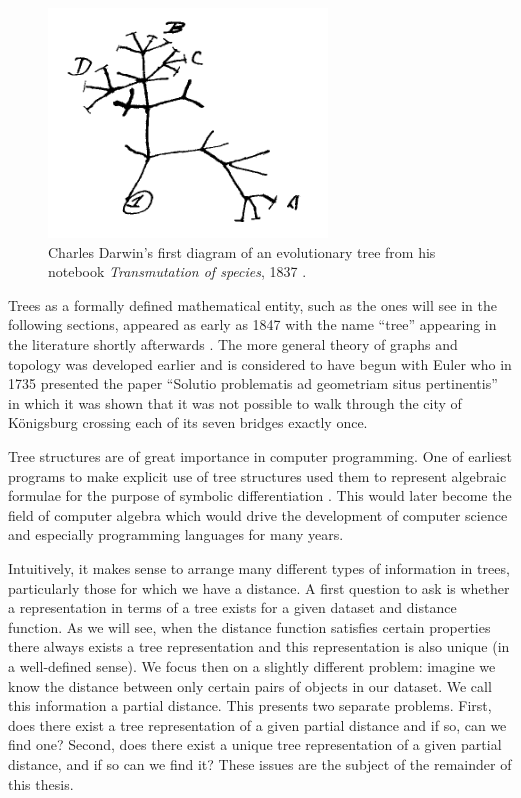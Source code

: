 \begin{figure}
  \centering
  \includegraphics[width=20em]{figures/background2/darwin-tree.png}
  \caption{Charles Darwin's first diagram of an evolutionary tree from his
    notebook \textit{Transmutation of species}, 1837 \cite{darwin1837notebook}.}
  \label{fig:darwin-tree}
\end{figure}

Trees as a formally defined mathematical entity, such as the ones will see in
the following sections, appeared as early as 1847 with the name ``tree''
appearing in the literature shortly afterwards \cite{knuth97taocp1}.  The more
general theory of graphs and topology was developed earlier and is considered
to have begun with Euler who in 1735 presented the paper ``Solutio problematis
ad geometriam situs pertinentis'' \cite{euler1735solutio} in which it was
shown that it was not possible to walk through the city of Königsburg crossing
each of its seven bridges exactly once.

Tree structures are of great importance in computer programming.  One of
earliest programs to make explicit use of tree structures used them to
represent algebraic formulae for the purpose of symbolic differentiation
\cite{knuth97taocp1,kahrimanian53differentiation}.  This would later become
the field of computer algebra which would drive the development of computer
science and especially programming languages for many years.

Intuitively, it makes sense to arrange many different types of information in
trees, particularly those for which we have a distance.  A first question to
ask is whether a representation in terms of a tree exists for a given dataset
and distance function.  As we will see, when the distance function satisfies
certain properties there always exists a tree representation and this
representation is also unique (in a well-defined sense).  We focus then on a
slightly different problem: imagine we know the distance between only certain
pairs of objects in our dataset.  We call this information a partial distance.
This presents two separate problems.  First, does there exist a tree
representation of a given partial distance and if so, can we find one?
Second, does there exist a unique tree representation of a given partial
distance, and if so can we find it?  These issues are the subject of the
remainder of this thesis.

